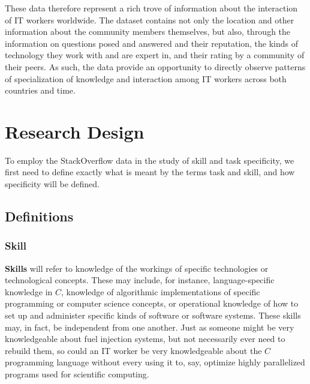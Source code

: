 \documentclass[11pt]{article}
\begin{document}
These data therefore represent a rich trove of information about the
interaction of IT workers worldwide. The dataset contains not only the location
and other information about the community members themselves, but also,
through the information on questions posed and answered and their reputation, the
kinds of technology they work with and are expert in, and their rating by
a community of their peers. As such, the data provide an opportunity
to directly observe patterns of specialization of knowledge and
interaction among IT workers across both countries and time. 

\section{Research Design}
\label{sec:research-design}

To employ the StackOverflow data in the study of skill and task
specificity, we first need to define exactly what is meant by the
terms task and skill, and how specificity will be defined. 

\subsection{Definitions}
\label{sec:definitions}

\subsubsection{Skill}
\label{sec:skill-specificity}

\textbf{Skills} will refer to knowledge of the workings of specific
technologies or technological concepts. These may include, for
instance, language-specific knowledge in $C$, knowledge of algorithmic
implementations of specific programming or computer science concepts,
or operational knowledge of how to set up and administer specific
kinds of software or software systems. These skills may, in fact, be
independent from one another. Just as someone might be very knowledgeable about fuel
injection systems, but not necessarily ever need to rebuild them, so
could an IT worker be very knowledgeable about the $C$ programming
language without every using it to, say, optimize highly parallelized
programs used for scientific computing.  
\end{document}
